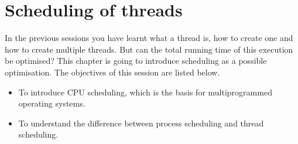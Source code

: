 \chapter[Session 4: Scheduling of threads]{Scheduling of threads}\label{chap:session4}
In the previous sessions you have learnt what a thread is, how to create one and how to create multiple threads. But can the total running time of this execution be optimised? This chapter is going to introduce scheduling as a possible optimisation. The objectives of this session are listed below.\\

\begin{itemize}
\item To introduce CPU scheduling, which is the basis for multiprogrammed operating systems.
\item To understand the difference between process scheduling and thread scheduling.
\end{itemize}

\newpage
